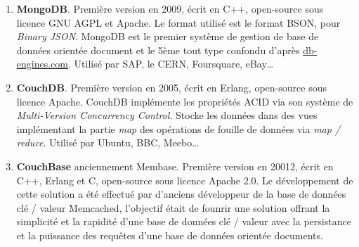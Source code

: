 	\begin{enumerate}
		\item \textbf{MongoDB}. Première version en 2009, écrit en C++, open-source sous licence GNU AGPL et Apache. Le format utilisé est le format BSON, pour \textit{Binary JSON}. MongoDB est le premier système de gestion de base de données orientée document et le 5ème tout type confondu d'après \url{db-engines.com}. Utilisé par SAP, le CERN, Foursquare, eBay\dots\cite{Wikipedia_mongodb}
		\item \textbf{CouchDB}. Première version en 2005, écrit en Erlang, open-source sous licence Apache. CouchDB implémente les propriétés ACID via son système de \textit{Multi-Version Concurrency Control}. Stocke les données dans des vues implémentant la partie \textit{map} des opérations de fouille de données via \textit{map / reduce}. Utilisé par Ubuntu, BBC, Meebo\dots\cite{Wikipedia_couchdb}
		\item \textbf{CouchBase} anciennement Membase. Première version en 20012, écrit en C++, Erlang et C, open-source sous licence Apache 2.0. Le développement de cette solution a été effectué par d'anciens développeur de la base de données clé / valeur Memcached, l'objectif était de founrir une solution offrant la simplicité et la rapidité d'une base de données clé / valeur avec la persistance et la puissance des requêtes d'une base de données orientée documents.\cite{Wikipedia_couchbase}
	\end{enumerate}
